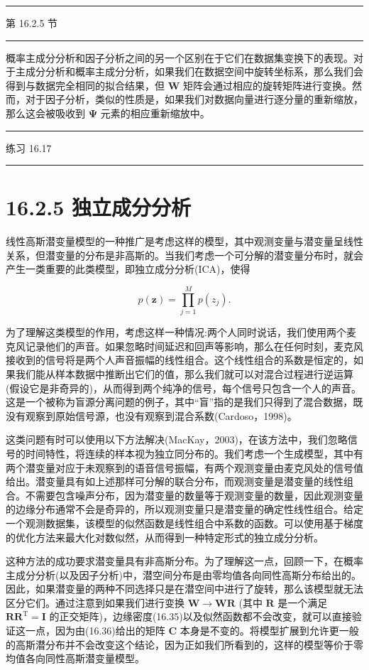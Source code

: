 \documentclass[10pt]{article}
\newcommand{\HRule}{\begin{center}\rule{0.9\linewidth}{0.2mm}\end{center}}
\begin{document}
\HRule

第 16.2.5 节

\HRule

概率主成分分析和因子分析之间的另一个区别在于它们在数据集变换下的表现。对于主成分分析和概率主成分分析，如果我们在数据空间中旋转坐标系，那么我们会得到与数据完全相同的拟合结果，但 \(\mathbf{W}\) 矩阵会通过相应的旋转矩阵进行变换。然而，对于因子分析，类似的性质是，如果我们对数据向量进行逐分量的重新缩放，那么这会被吸收到 \(\mathbf{\Psi }\) 元素的相应重新缩放中。

\HRule

练习 16.17

\HRule

\section*{16.2.5 独立成分分析}

线性高斯潜变量模型的一种推广是考虑这样的模型，其中观测变量与潜变量呈线性关系，但潜变量的分布是非高斯的。当我们考虑一个可分解的潜变量分布时，就会产生一类重要的此类模型，即独立成分分析(ICA)，使得

\[
p\left( \mathbf{z}\right)  = \mathop{\prod }\limits_{{j = 1}}^{M}p\left( {z}_{j}\right) . \tag{16.55}
\]

为了理解这类模型的作用，考虑这样一种情况:两个人同时说话，我们使用两个麦克风记录他们的声音。如果忽略时间延迟和回声等影响，那么在任何时刻，麦克风接收到的信号将是两个人声音振幅的线性组合。这个线性组合的系数是恒定的，如果我们能从样本数据中推断出它们的值，那么我们就可以对混合过程进行逆运算(假设它是非奇异的)，从而得到两个纯净的信号，每个信号只包含一个人的声音。这是一个被称为盲源分离问题的例子，其中“盲”指的是我们只得到了混合数据，既没有观察到原始信号源，也没有观察到混合系数(Cardoso，1998)。

这类问题有时可以使用以下方法解决(MacKay，2003)，在该方法中，我们忽略信号的时间特性，将连续的样本视为独立同分布的。我们考虑一个生成模型，其中有两个潜变量对应于未观察到的语音信号振幅，有两个观测变量由麦克风处的信号值给出。潜变量具有如上述那样可分解的联合分布，而观测变量是潜变量的线性组合。不需要包含噪声分布，因为潜变量的数量等于观测变量的数量，因此观测变量的边缘分布通常不会是奇异的，所以观测变量只是潜变量的确定性线性组合。给定一个观测数据集，该模型的似然函数是线性组合中系数的函数。可以使用基于梯度的优化方法来最大化对数似然，从而得到一种特定形式的独立成分分析。

这种方法的成功要求潜变量具有非高斯分布。为了理解这一点，回顾一下，在概率主成分分析(以及因子分析)中，潜空间分布是由零均值各向同性高斯分布给出的。因此，如果潜变量的两种不同选择只是在潜空间中进行了旋转，那么该模型就无法区分它们。通过注意到如果我们进行变换 \(\mathbf{W} \rightarrow  \mathbf{{WR}}\) (其中 \(\mathbf{R}\) 是一个满足 \({\mathbf{{RR}}}^{\mathrm{T}} = \mathbf{I}\) 的正交矩阵)，边缘密度(16.35)以及似然函数都不会改变，就可以直接验证这一点，因为由(16.36)给出的矩阵 \(\mathbf{C}\) 本身是不变的。将模型扩展到允许更一般的高斯潜分布并不会改变这个结论，因为正如我们所看到的，这样的模型等价于零均值各向同性高斯潜变量模型。
\end{document}
